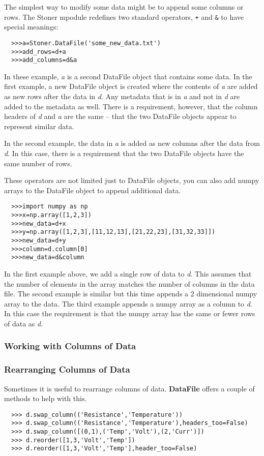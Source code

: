 \documentclass[a4paper,11pt]{scrartcl}
\begin{document}
The simplest way to modify some data might be to append some columns or rows.
The Stoner mpodule redefines two standard operators, \verb:+: and \verb:&: to
have special meanings:
\begin{verbatim}
  >>>a=Stoner.DataFile('some_new_data.txt')
  >>>add_rows=d+a
  >>>add_columns=d&a
\end{verbatim}
In these example, \textit{a} is a second DataFile object that contains some
data. In the first example, a new DataFile object is created where the contents
of \textit{a} are added as new rows after the data in \textit{d}. Any metadata
that is in \textit{a} and not in \textit{d} are added to the metadata as well.
There is a requirement, however, that the column headers of \textit{d} and
\textit{a} are the same -- \ie that the two DataFile objects appear to represent
similar data.

In the second example, the data in \textit{a} is added as new columns after the
data from \textit{d}. In this case, there is a requirement that the two DataFile
objects have the same number of rows.

These operators are not limited just to DataFile objects, you can also add numpy
arrays to the DataFile object to append additional data.
\begin{verbatim}
  >>>import numpy as np
  >>>x=np.array([1,2,3])
  >>>new_data=d+x
  >>>y=np.array([1,2,3],[11,12,13],[21,22,23],[31,32,33]])
  >>>new_data=d+y
  >>>column=d.column[0]
  >>>new_data=d&column
\end{verbatim}
In the first example above, we add a single row of data to \textit{d}. This
assumes that the number of elements in the array matches the number of columns
in the data file. The second example is similar but this time appends a 2
dimensional numpy array to the data. The third example appends a numpy array as
a column to \textit{d}. In this case the requirement is that the numpy array has
the same or fewer rows of data as \textit{d}.

\subsubsection{Working with Columns of Data}
\subsubsection{Rearranging Columns of Data}
Sometimes it is useful to rearrange columns of data. \textbf{DataFile} offers a couple of methods to help with this.
\begin{verbatim}
  >>> d.swap_column(('Resistance','Temperature'))
  >>> d.swap_column(('Resistance','Temperature'),headers_too=False)
  >>> d.swap_column([(0,1),('Temp','Volt'),(2,'Curr')])
  >>> d.reorder([1,3,'Volt','Temp'])
  >>> d.reorder([1,3,'Volt','Temp'],header_too=False)
\end{verbatim}
\end{document}
